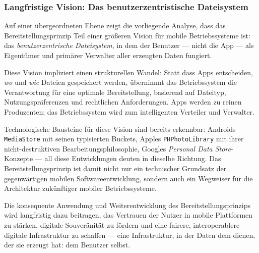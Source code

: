 ﻿\documentclass[12pt, a4paper]{article}
\begin{document}
\subsubsection{Langfristige Vision: Das benutzerzentristische Dateisystem}

Auf einer übergeordneten Ebene zeigt die vorliegende Analyse, dass das
Bereitstellungsprinzip Teil einer größeren Vision für mobile Betriebssysteme ist:
das \emph{benutzerzentrische Dateisystem}, in dem der Benutzer --- nicht die App ---
als Eigentümer und primärer Verwalter aller erzeugten Daten fungiert.

Diese Vision impliziert einen strukturellen Wandel: Statt dass Apps entscheiden,
\emph{wo} und \emph{wie} Dateien gespeichert werden, übernimmt das Betriebssystem
die Verantwortung für eine optimale Bereitstellung, basierend auf Dateityp,
Nutzungspräferenzen und rechtlichen Anforderungen. Apps werden zu reinen Produzenten;
das Betriebssystem wird zum intelligenten Verteiler und Verwalter.

Technologische Bausteine für diese Vision sind bereits erkennbar: Androids
\texttt{MediaStore} mit seinen typisierten Buckets, Apples \texttt{PHPhotoLibrary}
mit ihrer nicht-destruktiven Bearbeitungsphilosophie, Googles
\emph{Personal Data Store}-Konzepte --- all diese Entwicklungen deuten in dieselbe
Richtung. Das Bereitstellungsprinzip ist damit nicht nur ein technischer Grundsatz
der gegenwärtigen mobilen Softwareentwicklung, sondern auch ein Wegweiser für die
Architektur zukünftiger mobiler Betriebssysteme.

Die konsequente Anwendung und Weiterentwicklung des Bereitstellungsprinzips wird
langfristig dazu beitragen, das Vertrauen der Nutzer in mobile Plattformen zu stärken,
digitale Souveränität zu fördern und eine fairere, interoperablere digitale Infrastruktur
zu schaffen --- eine Infrastruktur, in der Daten dem dienen, der sie erzeugt hat:
dem Benutzer selbst.
\end{document}
